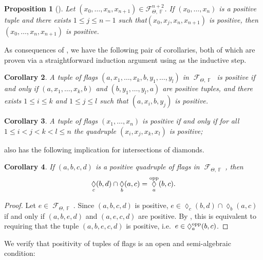 \documentclass{amsart}
\theoremstyle{plain}
\newtheorem{proposition}{Proposition}[section]
\newtheorem{corollary}[proposition]{Corollary}
\theoremstyle{definition}
\DeclareMathOperator{\Diam}{\lozenge}
\DeclareMathOperator{\Fc}{\mathcal{F}}
\DeclareMathOperator{\Fb}{{\mathbb{F}}}
\newcommand{\1}{\mathbf{1}}
\begin{document}
\begin{proposition}[{\cite[Proposition 3.1~(4)]{GLW}}]\label{lem: AddingElemToPosTuple}
    Let $(x_0,\ldots, x_n,x_{n+1}) \in \mathcal F_{\Theta,\Fb}^{n+2}$. If $(x_0, \ldots, x_n)$ is a positive tuple and there exists $1 \leq j \leq n-1$ such that\break $(x_0, x_j, x_n, x_{n+1})$ is positive, then $(x_0, \ldots, x_n, x_{n+1})$ is positive.
\end{proposition}

As consequences of , we have the following pair of corollaries, both of which are proven via a straightforward induction argument using  as the inductive step. 

\begin{corollary}\label{corollarly: gluing}
    A tuple of flags $(a,x_1, \ldots, x_k, b, y_1, \ldots ,y_l)$ in $\Fc_{\Theta,\Fb}$ is positive if and only if $(a, x_1, \ldots, x_k, b)$ and $(b, y_1, \ldots, y_l, a)$ are positive tuples, and there exists $1\leq i \leq k$ and $1\leq j \leq l$ such that $(a,x_i,b,y_j)$ is positive. 
\end{corollary}

\begin{corollary}\label{check quadruples}
A tuple of flags $(x_1,\dots,x_n)$ is positive if and only if for all $1\le i<j<k<l\le n$ the quadruple $(x_i, x_j, x_k, x_l)$ is positive;
\end{corollary}

 also has the following implication for intersections of diamonds.

\begin{corollary}\label{intersection of diamonds}
    If $(a,b,c,d)$ is a positive quadruple of flags in $\Fc_{\Theta,\Fb}$, then 
    \[\Diam_c(b,d)\cap\Diam_b(a,c)=\Diam_a^{\rm opp}(b,c).\]
\end{corollary}

\begin{proof}
Let $e\in\Fc_{\Theta,\Fb}$. Since $(a,b,c,d)$ is positive, $e\in \Diam_c(b,d)\cap\Diam_b(a,c)$ if and only if $(a,b,e,d)$ and $(a,e,c,d)$ are positive. By , this is equivalent to requiring that the tuple $(a,b,e,c,d)$ is positive, i.e.\ $e\in\Diam_a^{\rm opp}(b,c)$.
\end{proof}

We verify that positivity of tuples of flags is an open and semi-algebraic condition:
\end{document}
